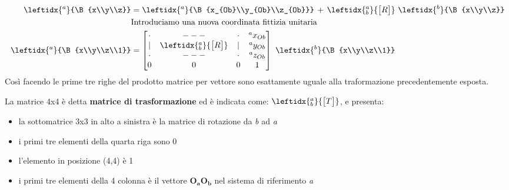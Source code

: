 \begin{align*}
\leftidx{^a}{\B{x\\y\\z}} &= \leftidx{^a}{\B{x_{Ob}\\y_{Ob}\\z_{Ob}}}\,+\,\leftidx{_b^a}{\M{R}}\,\,\leftidx{^b}{\B{x\\y\\z}}\\
&\text{Introduciamo una nuova coordinata fittizia unitaria}\\
\leftidx{^a}{\B{x\\y\\z\\1}}&=  \M{\cdot&---&\cdot&^ax_{Ob}\\|&\leftidx{_b^a}{\M{R}}&|&^ay_{Ob}\\\cdot&---&\cdot&^az_{Ob}\\0&0&0&1}\,\,\leftidx{^b}{\B{x\\y\\z\\1}}
\end{align*}
Così facendo le prime tre righe del prodotto matrice per vettore sono esattamente uguale alla traformazione precedentemente esposta.

La matrice 4x4 è detta \textbf{matrice di trasformazione} ed è indicata come: $\leftidx{_b^a}{\M{T}}$, e presenta:
\begin{itemize}
\item la sottomatrice 3x3 in alto a sinistra è la matrice di rotazione da \emph{b} ad \emph{a}
\item i primi tre elementi della quarta riga sono 0
\item l'elemento in posizione (4,4) è 1
\item i primi tre elementi della 4 colonna è il vettore $\mathbf{O_aO_b}$ nel sistema di riferimento \emph{a}
\end{itemize}


